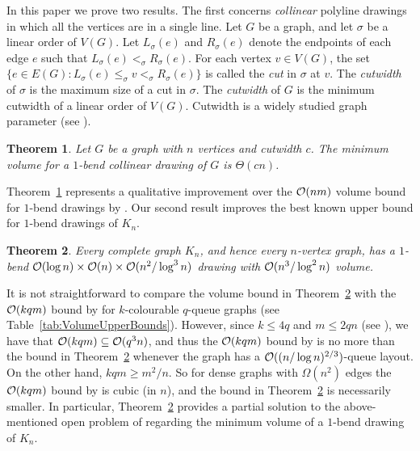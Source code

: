 \documentclass[a4paper]{article}
\newcommand{\Oh}[1]{\ensuremath{\protect\mathcal{O}(#1)}}
\newcommand{\thmlabel}[1]{\label{thm:#1}}
\newcommand{\thmref}[1]{Theorem~\ref{thm:#1}}
\newcommand{\tabref}[1]{Table~\ref{tab:#1}}
\theoremstyle{plain}
\newtheorem{theorem}{Theorem}
\begin{document}
In this paper we prove two results.  The first concerns \emph{collinear} polyline drawings in which all the vertices are in a single line.  Let $G$ be a graph, and let $\sigma$ be a linear order of $V(G)$.  Let $L_\sigma(e)$ and $R_\sigma(e)$ denote the endpoints of each edge $e$ such that $L_\sigma(e)<_\sigma R_\sigma(e)$. For each vertex $v\in V(G)$, the set $\{e\in E(G):L_\sigma(e)\leq_\sigma v<_\sigma R_\sigma(e)\}$ is called the \emph{cut} in $\sigma$ at $v$. The \emph{cutwidth} of $\sigma$ is the maximum size of a cut in $\sigma$. The \emph{cutwidth} of $G$ is the minimum cutwidth of a linear order of $V(G)$.  Cutwidth is a widely studied graph parameter (see \citep{DPS-GraphLayouts}).

\begin{theorem}
\thmlabel{CollinearVertices} 
Let $G$ be a graph with $n$ vertices and cutwidth $c$.  The minimum volume for
a $1$-bend collinear drawing of $G$ is $\Theta(cn)$.
\end{theorem}

\thmref{CollinearVertices} represents a qualitative improvement over the
\Oh{nm} volume bound for $1$-bend drawings by \citet{DujWoo-Subdivisions-DMTCS}. Our second result improves the best known upper bound for $1$-bend drawings of
$K_n$. 

\begin{theorem}
\thmlabel{Main}
Every complete graph $K_n$, and hence every $n$-vertex graph, has a $1$-bend
$\Oh{\log n}\times\Oh{n}\times\Oh{n^2/\log^3n}$ drawing with $\Oh{n^3/\log^2 n}$
volume.
\end{theorem}

It is not straightforward to compare the volume bound in \thmref{Main} with the \Oh{kqm} bound by \citet{DujWoo-Subdivisions-DMTCS} for $k$-colourable $q$-queue graphs (see \tabref{VolumeUpperBounds}). However, since $k\leq 4q$ and $m\leq 2qn$ (see \citep{DujWoo-LinearLayouts-DMTCS04}), we have that $\Oh{kqm}\subseteq\Oh{q^3n}$, and thus the \Oh{kqm} bound by \citet{DujWoo-Subdivisions-DMTCS} is no more than the  bound in \thmref{Main} whenever the graph has a \Oh{(n/\log n)^{2/3}}-queue layout. On the other hand, $kqm\geq m^2/n$. So for dense graphs with $\Omega(n^2)$ edges the \Oh{kqm} bound  by \citet{DujWoo-Subdivisions-DMTCS} is cubic (in $n$), and the bound in \thmref{Main} is necessarily smaller. In particular, \thmref{Main} provides a partial solution to the above-mentioned open problem of \citet{Wismath-TR04} regarding the minimum volume of a $1$-bend drawing of $K_n$.
\end{document}
